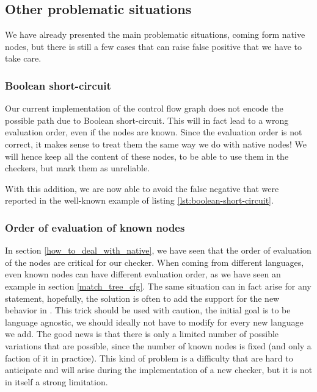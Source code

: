 \subsection{Other problematic situations}
\label{subsec:other_problematic_situation}
	
We have already presented the main problematic situations, coming form native nodes, but there is still a few cases that can raise false positive that we have to take care.

\subsubsection{Boolean short-circuit}
\label{subsubsec:boolean_short_circuit}

Our current implementation of the control flow graph does not encode the possible path due to Boolean short-circuit. 
This will in fact lead to a wrong evaluation order, even if the nodes are known. 
Since the evaluation order is not correct, it makes sense to treat them the same way we do with native nodes! 
We will hence keep all the content of these nodes, to be able to use them in the checkers, but mark them as unreliable. 



With this addition, we are now able to avoid the false negative that were reported in the well-known example of listing \ref{lst:boolean-short-circuit}.

\subsubsection{Order of evaluation of known nodes}
\label{subsubsec:evaluation_known_nodes}

In section \ref{how_to_deal_with_native}, we have seen that the order of evaluation of the nodes are critical for our checker.
When coming from different languages, even known nodes can have different evaluation order, as we have seen an example in section \ref{match_tree_cfg}. 
The same situation can in fact arise for any statement, hopefully, the solution is often to add the support for the new behavior in \slang.
This trick should be used with caution, the initial goal is to be language agnostic, we should ideally not have to modify \slang for every new language we add. The good news is that there is only a limited number of possible variations that are possible, since the number of known nodes is fixed (and only a faction of it in practice). 
This kind of problem is a difficulty that are hard to anticipate and will arise during the implementation of a new checker, but it is not in itself a strong limitation.

